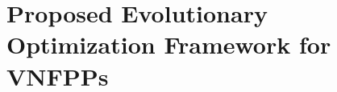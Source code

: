 
%	
%
%
%
%	
%
%
%
%
%
%
%
%
%
%
%
%
%
%
%
%
%

\section{Proposed Evolutionary Optimization Framework for VNFPPs}
\label{sec:optimisation}

